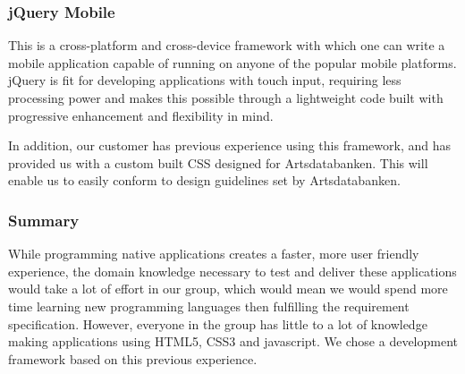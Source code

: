 \subsubsection{jQuery Mobile}
This is a cross-platform and cross-device framework with which one can write
a mobile application capable of running on anyone of the popular mobile platforms.
jQuery is fit for developing applications with touch input, requiring
less processing power and  makes this possible through a lightweight code
built with progressive enhancement and flexibility in mind.

In addition, our customer has previous experience using this framework, and has provided us with a custom built CSS designed for Artsdatabanken. This will enable us to easily conform to design guidelines set by Artsdatabanken.

\subsubsection{Summary}
While programming native applications creates a faster, more user friendly experience, the domain knowledge necessary to test and deliver these applications would take a lot of effort in our group, which would mean we would spend more time learning new programming languages then fulfilling the requirement specification. However, everyone in the group has little to a lot of knowledge making applications using HTML5, CSS3 and javascript. We chose a development framework based on this previous experience.
